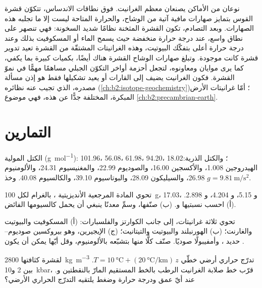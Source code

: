 نوعان من الأماكن يصنعان معظم الغرانيت. فوق نطاقات الاندساس، تتكوّن قشرة القوس
بتمايز صهارات مافية آتية من الوشاح، والحرارة المتاحة ليست إلا ما تجلبه هذه
الصهارات. وبعد التصادم، تكون القشرة المثخنة نظامًا شديد السخونة: فهي تنصهر على
نطاق واسع، عند درجة حرارة منخفضة حيث يسمح الماء أو المسكوفيت بذلك وعند درجة حرارة أعلى
بتفكّك البيوتيت، وهذه الغرانيتات المشتقّة من القشرة تعيد تدوير قشرة
كانت موجودة. وتبلغ صهارات الوشاح القشرة هناك أيضًا، بكميات كبيرة بما يكفي، كما يرى موايان
ومعاونوه، لتجعل أحزمة أواخر التكوّن الجبلي مساهمًا مهمًّا في نموّ
القشرة. فكون الغرانيت يضيف إلى القارات أو يعيد تشكيلها فقط هو إذن مسألة
مصدره، الذي تجيب عنه نظائره (\cref{ch:b2:isotope-geochemistry})؛ أمّا غرانيتات
الأرض المبكرة، المختلفة جدًّا عن هذه، فهي موضوع
\cref{ch:b2:precambrian-earth}.

\section{التمارين}\label{sec:b2:crustal-melting:exercises}

الكتل المولية (\unit{\gram\per\mole}):  101.96،  56.08،  61.98،
 94.20،  18.02؛ والكتل الذرية: الهيدروجين 1.008، والأكسجين 16.00، والصوديوم 22.99، والمغنيسيوم 24.31،
والألومنيوم 26.98، والسيليكون 28.09، والبوتاسيوم 39.10، والكالسيوم 40.08. وخذ $g = \qty{9.81}{\metre\per\second\squared}$.

\begin{exercise}[$\star$]\label{exo:b2:crustal-melting:1}
تحوي المادة المرجعية الأنديزيتية ، بالغرام لكل \qty{100}{\gram}،
 17.03، و 5.15، و 4.204، و 2.898.
(أ) احسب نسبتيها  و. (ب) صنّفها، وسمِّ معدنًا ينبغي أن يحمل
كالسيومها الفائض.
\end{exercise}

\begin{exercise}[$\star$]\label{exo:b2:crustal-melting:2}
تحوي ثلاثة غرانيتات، إلى جانب الكوارتز والفلسبارات: (أ) المسكوفيت والبيوتيت والغارنت؛
(ب) الهورنبلند والبيوتيت والتيتانيت؛ (ج) الإيجيرين، وهو بيروكسين صوديوم--حديد
، وأمفيبولًا صوديًا. صنّف كلًّا منها بتشبّعه بالألومنيوم، وقل
أيّها يمكن أن يكون .
\end{exercise}

\begin{exercise}[$\star$]\label{exo:b2:crustal-melting:3}
لقشرة كثافتها \qty{2800}{\kilogram\per\cubic\metre} تدرّج حراري أرضي خطّي
$T = \qty{10}{\celsius} + (\qty{20}{\celsius\per\kilo\metre})\,z$. بين 2
و\qty{10}{kbar}، قرّب خط صلابة الغرانيت الرطب بالخط المستقيم المارّ بالنقطتين
 و. عند أيّ
عمق ودرجة حرارة وضغط يلتقيه التدرّج الحراري الأرضي؟
\end{exercise}

